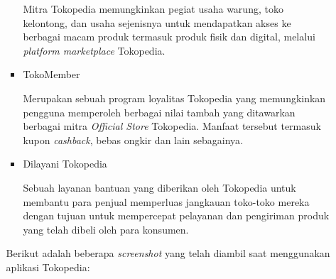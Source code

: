 \documentclass[a4paper]{article}
\begin{document}
\begin{itemize}
\begin{enumerate}
\begin{itemize}
            Mitra Tokopedia memungkinkan pegiat usaha warung, toko kelontong, dan usaha sejenisnya untuk mendapatkan akses ke berbagai macam produk termasuk produk fisik dan digital, melalui \textit{platform marketplace} Tokopedia\autocite{inovasi-tokped}.

            \item TokoMember
            
            Merupakan sebuah program loyalitas Tokopedia yang memungkinkan pengguna memperoleh berbagai nilai tambah yang ditawarkan berbagai mitra \textit{Official Store} Tokopedia. Manfaat tersebut termasuk kupon \textit{cashback}, bebas ongkir dan lain sebagainya\autocite{blog-fitur-tokped}.

            \item Dilayani Tokopedia
            
            Sebuah layanan bantuan yang diberikan oleh Tokopedia untuk membantu para penjual memperluas jangkauan toko-toko mereka dengan tujuan untuk mempercepat pelayanan dan pengiriman produk yang telah dibeli oleh para konsumen\autocite{inovasi-tokped}.

        \end{itemize}

        Berikut adalah beberapa \textit{screenshot} yang telah diambil saat menggunakan aplikasi Tokopedia:


\end{enumerate}
\end{itemize}
\end{document}
